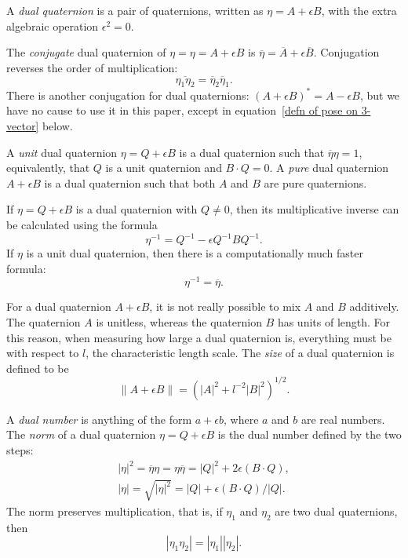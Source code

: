 \documentclass[reqno,12pt]{amsart}
\begin{document}
A \emph{dual quaternion} is a pair of quaternions, written as $\eta = A + \epsilon B$, with the extra algebraic operation $\epsilon^2 = 0$.

The \emph{conjugate} dual quaternion of $\eta = \eta = A + \epsilon B$ is $\overline\eta = \overline A + \epsilon \overline B$.  Conjugation reverses the order of multiplication:
\begin{equation}
\overline{\eta_1\eta_2} = \overline \eta_2 \overline \eta_1 .
\end{equation}
There is another conjugation for dual quaternions: $(A + \epsilon B)^* = A - \epsilon B$, but we have no cause to use it in this paper, except in equation~\eqref{defn of pose on 3-vector} below.

A \emph{unit} dual quaternion $\eta = Q + \epsilon B$ is a dual quaternion such that $\overline\eta\eta = 1$, equivalently, that $Q$ is a unit quaternion and $B \cdot Q = 0$.  A \emph{pure} dual quaternion $A + \epsilon B$ is a dual quaternion such that both $A$ and $B$ are pure quaternions.

If $\eta = Q + \epsilon B$ is a dual quaternion with $Q \ne 0$, then its multiplicative inverse can be calculated using the formula
\begin{equation}
\eta^{-1} = Q^{-1} - \epsilon Q^{-1} B Q^{-1}.
\end{equation}
If $\eta$ is a unit dual quaternion, then there is a computationally much faster formula:
\begin{equation}
\label{inverse unit}
\eta^{-1} = \overline \eta.
\end{equation}

For a dual quaternion $A + \epsilon B$, it is not really possible to mix $A$ and $B$ additively.  The quaternion $A$ is unitless, whereas the quaternion $B$ has units of length.  For this reason, when measuring how large a dual quaternion is, everything must be with respect to $l$, the characteristic length scale.  The \emph{size} of a dual quaternion is defined to be
\begin{equation}
\label{size}
\|A+\epsilon B\| = \left(|A|^2 + l^{-2}|B|^2\right)^{1/2}.
\end{equation}

A \emph{dual number} is anything of the form $a + \epsilon b$, where $a$ and $b$ are real numbers.  The \emph{norm} of a dual quaternion $\eta = Q + \epsilon B$ is the dual number defined by the two steps:
\begin{gather}
|\eta|^2 = \overline{\eta} \eta = \eta \overline\eta = |Q|^2 + 2 \epsilon (B \cdot Q) ,\\
\label{norm}
|\eta| = \sqrt{|\eta|^2} = |Q| + \epsilon (B \cdot Q) / |Q| .
\end{gather}
The norm preserves multiplication, that is, if $\eta_1$ and $\eta_2$ are two dual quaternions, then
\begin{equation}
|\eta_1 \eta_2| = |\eta_1| |\eta_2| .
\end{equation}
\end{document}
